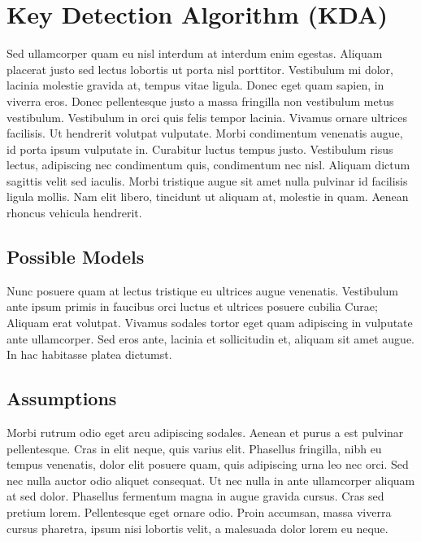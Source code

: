 \section{Key Detection Algorithm (KDA)}

Sed ullamcorper quam eu nisl interdum at interdum enim egestas. Aliquam placerat justo sed lectus lobortis ut porta nisl porttitor. Vestibulum mi dolor, lacinia molestie gravida at, tempus vitae ligula. Donec eget quam sapien, in viverra eros. Donec pellentesque justo a massa fringilla non vestibulum metus vestibulum. Vestibulum in orci quis felis tempor lacinia. Vivamus ornare ultrices facilisis. Ut hendrerit volutpat vulputate. Morbi condimentum venenatis augue, id porta ipsum vulputate in. Curabitur luctus tempus justo. Vestibulum risus lectus, adipiscing nec condimentum quis, condimentum nec nisl. Aliquam dictum sagittis velit sed iaculis. Morbi tristique augue sit amet nulla pulvinar id facilisis ligula mollis. Nam elit libero, tincidunt ut aliquam at, molestie in quam. Aenean rhoncus vehicula hendrerit.

\subsection{Possible Models}

Nunc posuere quam at lectus tristique eu ultrices augue venenatis. Vestibulum ante ipsum primis in faucibus orci luctus et ultrices posuere cubilia Curae; Aliquam erat volutpat. Vivamus sodales tortor eget quam adipiscing in vulputate ante ullamcorper. Sed eros ante, lacinia et sollicitudin et, aliquam sit amet augue. In hac habitasse platea dictumst.


\subsection{Assumptions}
Morbi rutrum odio eget arcu adipiscing sodales. Aenean et purus a est pulvinar pellentesque. Cras in elit neque, quis varius elit. Phasellus fringilla, nibh eu tempus venenatis, dolor elit posuere quam, quis adipiscing urna leo nec orci. Sed nec nulla auctor odio aliquet consequat. Ut nec nulla in ante ullamcorper aliquam at sed dolor. Phasellus fermentum magna in augue gravida cursus. Cras sed pretium lorem. Pellentesque eget ornare odio. Proin accumsan, massa viverra cursus pharetra, ipsum nisi lobortis velit, a malesuada dolor lorem eu neque.


